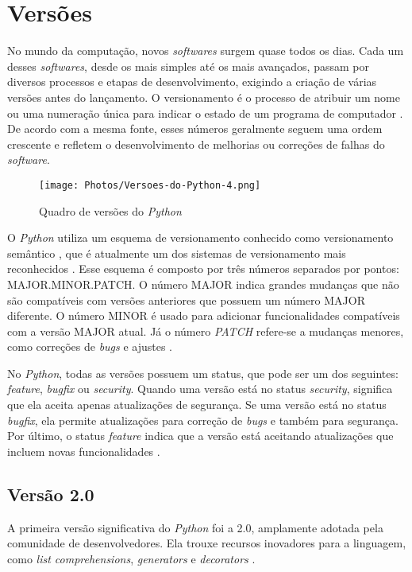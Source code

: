 
\section{Versões}

No mundo da computação, novos \textit{softwares} surgem quase todos os dias. Cada um desses \textit{softwares}, desde os mais simples até os mais avançados, passam por diversos processos e etapas de desenvolvimento, exigindo a criação de várias versões antes do lançamento. O versionamento é o processo de atribuir um nome ou uma numeração única para indicar o estado de um programa de computador \cite{wikipedia_versionamento}. De acordo com a mesma fonte, esses números geralmente seguem uma ordem crescente e refletem o desenvolvimento de melhorias ou correções de falhas do \textit{software}.

\begin{figure}
    \centering
    \texttt{[image: Photos/Versoes-do-Python-4.png]}
    \caption{Quadro de versões do \textit{Python} \cite{hashtagtreinamentos_python_versions}}
    \label{fig:enter-label}
\end{figure}

O \textit{Python} utiliza um esquema de versionamento conhecido como versionamento semântico \cite{hashtagtreinamentos_python_versions}, que é atualmente um dos sistemas de versionamento mais reconhecidos \cite{wikipedia_versionamento}. Esse esquema é composto por três números separados por pontos: MAJOR.MINOR.PATCH. O número MAJOR indica grandes mudanças que não são compatíveis com versões anteriores que possuem um número MAJOR diferente. O número MINOR é usado para adicionar funcionalidades compatíveis com a versão MAJOR atual. Já o número \textit{PATCH} refere-se a mudanças menores, como correções de \textit{bugs} e ajustes \cite{wikipedia_versionamento}.

No \textit{Python}, todas as versões possuem um status, que pode ser um dos seguintes: \textit{feature}, \textit{bugfix} ou \textit{security}. Quando uma versão está no status \textit{security}, significa que ela aceita apenas atualizações de segurança. Se uma versão está no status \textit{bugfix}, ela permite atualizações para correção de \textit{bugs} e também para segurança. Por último, o status \textit{feature} indica que a versão está aceitando atualizações que incluem novas funcionalidades \cite{hashtagtreinamentos_python_versions}.


\subsection{Versão 2.0}
A primeira versão significativa do \textit{Python} foi a 2.0, amplamente adotada pela comunidade de desenvolvedores. Ela trouxe recursos inovadores para a linguagem, como \textit{list comprehensions}, \textit{generators} e \textit{decorators} \cite{awari_python_version}.

